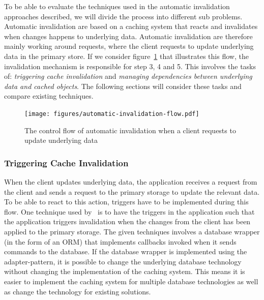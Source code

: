 To be able to evaluate the techniques used in the automatic invalidation approaches described, we will divide the process into different sub problems. Automatic invalidation are based on a caching system that reacts and invalidates when changes happens to underlying data. Automatic invalidation are therefore mainly working around requests, where the client requests to update underlying data in the primary store. If we consider figure~\ref{fig:automatic-invalidation-flow} that illustrates this flow, the invalidation mechanism is responsible for step 3, 4 and 5. This involves the tasks of: \emph{triggering cache invalidation} and \emph{managing dependencies between underlying data and cached objects}. The following sections will consider these tasks and compare existing techniques.

\begin{figure}[ht!]
  \centering
  \texttt{[image: figures/automatic-invalidation-flow.pdf]}
  \caption{The control flow of automatic invalidation when a client requests to update underlying data}
  \label{fig:automatic-invalidation-flow}
\end{figure}

\subsubsection{Triggering Cache Invalidation}
\label{subsubsec:triggering-cache-invalidation}

When the client updates underlying data, the application receives a request from the client and sends a request to the primary storage to update the relevant data. To be able to react to this action, triggers have to be implemented during this flow. One technique used by~\cite{paper:cache-genie, paper:deploy-time} is to have the triggers in the application such that the application triggers invalidation when the changes from the client has been applied to the primary storage. The given techniques involves a database wrapper (in the form of an ORM) that implements callbacks invoked when it sends commands to the database. If the database wrapper is implemented using the adapter-pattern, it is possible to change the underlying database technology without changing the implementation of the caching system. This means it is easier to implement the caching system for multiple database technologies as well as change the technology for existing solutions.

